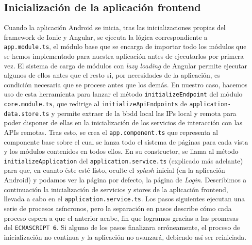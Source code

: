 \subsection{Inicialización de la aplicación frontend}
\label{ch:Capitulo4.6.4}

Cuando la aplicación Android se inicia, tras las inicializaciones propias del framework de Ionic y Angular, se ejecuta la lógica correspondiente a \verb|app.module.ts|, el módulo base que se encarga de importar todo los módulos que se hemos implementado para nuestra aplicación antes de ejecutarlos por primera vez. El sistema de carga de módulos con \textit{lazy loading} de Angular permite ejecutar algunos de ellos antes que el resto si, por necesidades de la aplicación, es condición necesaria que se procese antes que los demás. En nuestro caso, hacemos uso de esta herramienta para lanzar el método \verb|initializeEndpoint| del módulo \verb|core.module.ts|, que redirige al \verb|initializeApiEndpoints| de \verb|application-data.store.ts| y permite extraer de la \gls{bbdd} local las IPs local y remota para poder disponer de ellas en la inicialización de los servicios de interacción con las APIs remotas.
\vspace{0.5cm}
Tras esto, se crea el \verb|app.component.ts| que representa al componente base sobre el cual se lanza todo el sistema de páginas para cada vista y los módulos contenidos en todos ellos. En su constructor, se llama al método \verb|initializeApplication| del \verb|application.service.ts| (explicado más adelante) para que, en cuanto éste esté listo, oculte el \textit{splash} inicial (en la aplicación Android) y podamos ver la página por defecto, la página de \textit{Login}.
\vspace{0.5cm}
Describimos a continuación la inicialización de servicios y stores de la aplicación frontend, llevada a cabo en el \verb|application.service.ts|. Los pasos siguientes ejecutan una serie de procesos asíncronos, pero la separación en pasos describe cómo cada proceso espera a que el anterior acabe, fin que logramos gracias a las promesas del \verb|ECMASCRIPT 6|. Si alguno de los pasos finalizara erróneamente, el proceso de inicialización no continua y la aplicación no avanzará, debiendo así ser reiniciada.
